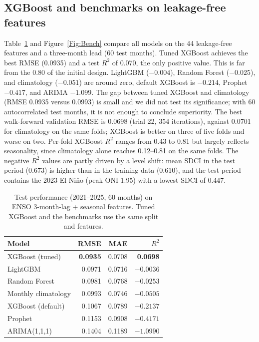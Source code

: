 \documentclass[11pt,twoside]{article}
\begin{document}
\subsection{XGBoost and benchmarks on leakage-free features}
\label{SubSec:ML}

Table~\ref{Tab:Bench} and Figure~\ref{Fig:Bench} compare all models on the 44 leakage-free features and a three-month lead (60 test months). Tuned XGBoost achieves the best RMSE (0.0935) and a test $R^2$ of 0.070, the only positive value. This is far from the 0.80 of the initial design. LightGBM ($-0.004$), Random Forest ($-0.025$), and climatology ($-0.051$) are around zero, default XGBoost is $-0.214$, Prophet $-0.417$, and ARIMA $-1.099$. The gap between tuned XGBoost and climatology (RMSE 0.0935 versus 0.0993) is small and we did not test its significance; with 60 autocorrelated test months, it is not enough to conclude superiority. The best walk-forward validation RMSE is 0.0698 (trial 22, 354 iterations), against 0.0701 for climatology on the same folds; XGBoost is better on three of five folds and worse on two. Per-fold XGBoost $R^2$ ranges from 0.43 to 0.81 but largely reflects seasonality, since climatology alone reaches 0.12--0.81 on the same folds. The negative $R^2$ values are partly driven by a level shift: mean SDCI in the test period (0.673) is higher than in the training data (0.610), and the test period contains the 2023 El Ni\~no (peak ONI 1.95) with a lowest SDCI of 0.447.

\begin{table}[ht]
\centering
\caption{Test performance (2021--2025, 60 months) on ENSO 3-month-lag + seasonal features. Tuned XGBoost and the benchmarks use the same split and features.}
\label{Tab:Bench}
\small
\begin{tabular}{lrrr}
\toprule
Model & RMSE & MAE & $R^2$ \\
\midrule
XGBoost (tuned)     & \textbf{0.0935} & 0.0708 & \textbf{0.0698} \\
LightGBM            & 0.0971 & 0.0716 & $-0.0036$ \\
Random Forest       & 0.0981 & 0.0768 & $-0.0253$ \\
Monthly climatology & 0.0993 & 0.0746 & $-0.0505$ \\
XGBoost (default)   & 0.1067 & 0.0789 & $-0.2137$ \\
Prophet             & 0.1153 & 0.0908 & $-0.4171$ \\
ARIMA(1,1,1)        & 0.1404 & 0.1189 & $-1.0990$ \\
\bottomrule
\end{tabular}
\end{table}
\end{document}
